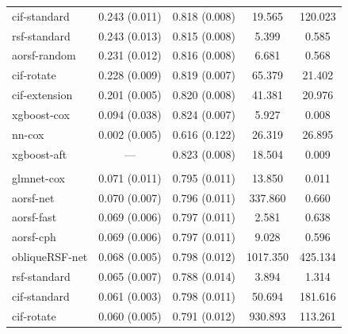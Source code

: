 \documentclass{article}\usepackage[]{graphicx}\usepackage[]{xcolor}
\newenvironment{knitrout}{}{} %
\begin{document}
\begin{knitrout}
\begin{longtable}[t]{lcccc}
\hspace{1em}cif-standard & 0.243 (0.011) & 0.818 (0.008) & 19.565 & 120.023\\
\hspace{1em}rsf-standard & 0.243 (0.013) & 0.815 (0.008) & 5.399 & 0.585\\
\hspace{1em}aorsf-random & 0.231 (0.012) & 0.816 (0.008) & 6.681 & 0.568\\
\hspace{1em}cif-rotate & 0.228 (0.009) & 0.819 (0.007) & 65.379 & 21.402\\
\hspace{1em}cif-extension & 0.201 (0.005) & 0.820 (0.008) & 41.381 & 20.976\\
\hspace{1em}xgboost-cox & 0.094 (0.038) & 0.824 (0.007) & 5.927 & 0.008\\
\hspace{1em}nn-cox & 0.002 (0.005) & 0.616 (0.122) & 26.319 & 26.895\\
\hspace{1em}xgboost-aft & --- & 0.823 (0.008) & 18.504 & 0.009\\
\addlinespace[0.3em]
\multicolumn{5}{l}{\textit{\textbf{SPRINT; CVD death, n = 9361, p = 174}}}\\
\hline
\hspace{1em}glmnet-cox & 0.071 (0.011) & 0.795 (0.011) & 13.850 & 0.011\\
\hspace{1em}aorsf-net & 0.070 (0.007) & 0.796 (0.011) & 337.860 & 0.660\\
\hspace{1em}aorsf-fast & 0.069 (0.006) & 0.797 (0.011) & 2.581 & 0.638\\
\hspace{1em}aorsf-cph & 0.069 (0.006) & 0.797 (0.011) & 9.028 & 0.596\\
\hspace{1em}obliqueRSF-net & 0.068 (0.005) & 0.798 (0.012) & 1017.350 & 425.134\\
\hspace{1em}rsf-standard & 0.065 (0.007) & 0.788 (0.014) & 3.894 & 1.314\\
\hspace{1em}cif-standard & 0.061 (0.003) & 0.798 (0.011) & 50.694 & 181.616\\
\hspace{1em}cif-rotate & 0.060 (0.005) & 0.791 (0.012) & 930.893 & 113.261\\

\end{longtable}
\end{knitrout}
\end{document}
